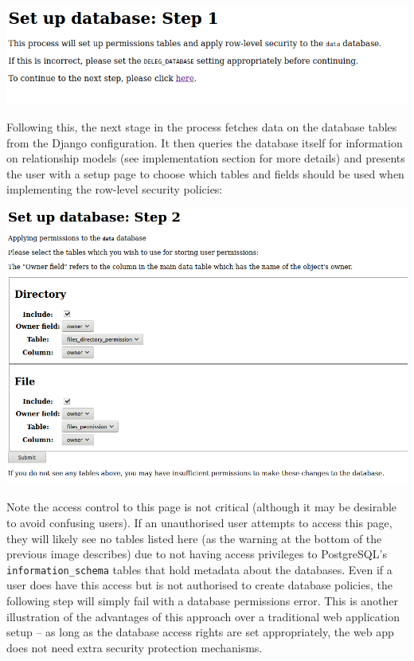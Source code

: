 \documentclass[12pt]{report}
\begin{document}
\begin{center}
  \includegraphics[scale=0.5]{02-setup1.png}
\end{center}

Following this, the next stage in the process fetches data on the database tables from the Django configuration. It then queries the database itself for information on relationship models (see implementation section for more details) and presents the user with a setup page to choose which tables and fields should be used when implementing the row-level security policies:

\begin{center}
  \includegraphics[width=\textwidth]{03-setup2.png}
\end{center}

Note the access control to this page is not critical (although it may be desirable to avoid confusing users). If an unauthorised user attempts to access this page, they will likely see no tables listed here (as the warning at the bottom of the previous image describes) due to not having access privileges to PostgreSQL's \verb+information_schema+ tables that hold metadata about the databases. Even if a user does have this access but is not authorised to create database policies, the following step will simply fail with a database permissions error. This is another illustration of the advantages of this approach over a traditional web application setup -- as long as the database access rights are set appropriately, the web app does not need extra security protection mechanisms.
\end{document}
